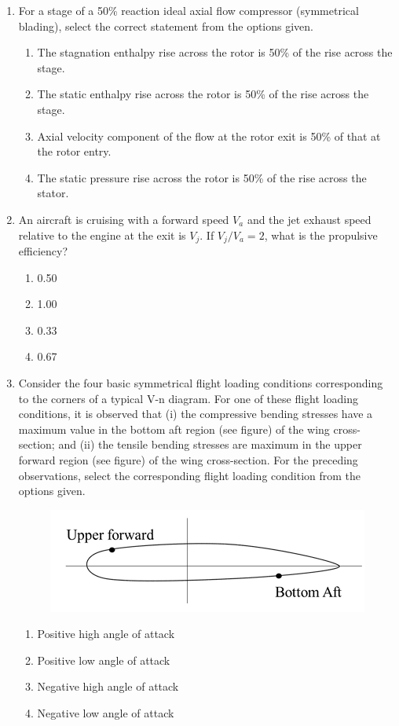 \documentclass{article}
\begin{document}
\begin{enumerate}[leftmargin=*, resume]
\item For a stage of a 50\% reaction ideal axial flow compressor (symmetrical blading), select the correct statement from the options given.
\begin{multicols}{2}
\begin{enumerate}
\item The stagnation enthalpy rise across the rotor is 50\% of the rise across the stage.
\item The static enthalpy rise across the rotor is 50\% of the rise across the stage.
\item Axial velocity component of the flow at the rotor exit is 50\% of that at the rotor entry.
\item The static pressure rise across the rotor is 50\% of the rise across the stator.
\end{enumerate}
\end{multicols}

\item An aircraft is cruising with a forward speed $V_a$ and the jet exhaust speed relative to the engine at the exit is $V_j$. If $V_j/V_a = 2$, what is the propulsive efficiency?
\begin{multicols}{4}
\begin{enumerate}
\item 0.50
\item 1.00
\item 0.33
\item 0.67
\end{enumerate}
\end{multicols}

\item Consider the four basic symmetrical flight loading conditions corresponding to the corners of a typical V-n diagram. For one of these flight loading conditions, it is observed that (i) the compressive bending stresses have a maximum value in the bottom aft region (see figure) of the wing cross-section; and (ii) the tensile bending stresses are maximum in the upper forward region (see figure) of the wing cross-section. For the preceding observations, select the corresponding flight loading condition from the options given.
\begin{figure}[H]
    \centering
    \includegraphics[width=0.5\linewidth]{figs/q23.png}
    \caption{}
    \label{fig:q23}
\end{figure}
\begin{multicols}{2}
\begin{enumerate}
\item Positive high angle of attack
\item Positive low angle of attack
\item Negative high angle of attack
\item Negative low angle of attack
\end{enumerate}
\end{multicols}


\end{enumerate}
\end{document}
